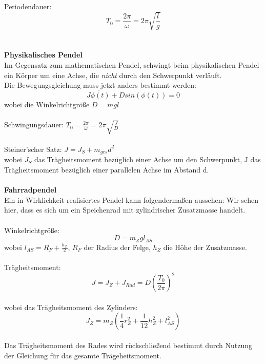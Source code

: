 \documentclass{article}
\begin{document}
Periodendauer:
\begin{equation*}
T_0 = \frac{2\pi}{\omega} = 2\pi\sqrt{\frac{l}{g}}
\end{equation*}\\
\\
\textbf{Physikalisches Pendel}\\
Im Gegensatz zum mathematischen Pendel, schwingt beim physikalischen Pendel ein Körper um eine Achse, die \textit{nicht} durch den Schwerpunkt verläuft.\\
Die Bewegungsgleichung muss jetzt anders bestimmt werden:
\begin{equation*}
J\ddot{\phi(t)} + D sin(\phi(t)) = 0
\end{equation*}
wobei die Winkelrichtgröße $D=mgl$\\
\\
Schwingungsdauer: $T_0=\frac{2\pi}{\omega}=2\pi\sqrt{\frac{J}{D}}$\\
\\
Steiner'scher Satz: $J = J_S + m_{ges} d^2$\\
wobei $J_S$ das Trägheitsmoment bezüglich einer Achse um den Schwerpunkt, J das Trägheitsmoment bezüglich einer parallelen Achse im Abstand d.\\
\\
\textbf{Fahrradpendel}\\
Ein in Wirklichkeit realisiertes Pendel kann folgendermaßen aussehen:
Wir sehen hier, dass es sich um ein Speichenrad mit zylindrischer Zusatzmasse handelt.\\
\\
Winkelrichtgröße:
$$D=m_Z g l_{AS}$$
wobei $l_{AS}=R_F + \frac{h_Z}{2}$, $R_F$ der Radius der Felge, $h_Z$ die Höhe der Zusatzmasse.\\
\\
Trägheitsmoment:
\begin{equation*}
J = J_Z + J_{Rad} = D (\frac{T_0}{2\pi})^2
\end{equation*}
\\
wobei das Trägheitsmoment des Zylinders:
\begin{equation*}
J_Z = m_Z(\frac{1}{4}r^2_Z + \frac{1}{12}h^2_Z+l^2_{AS})
\end{equation*}
\\
Das Trägheitsmoment des Rades wird rückschließend bestimmt durch Nutzung der Gleichung für das gesamte Trägeheitsmoment.
\\
\end{document}
